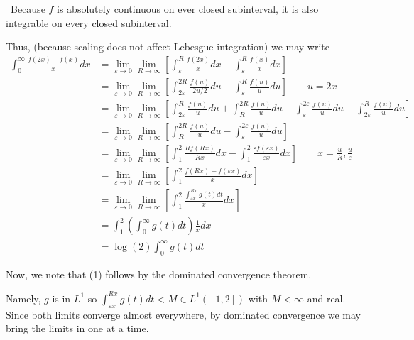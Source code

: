 \documentclass[12pt]{Homework}
\begin{document}
\begin{solution}$\,$
Because $f$ is absolutely continuous on ever closed subinterval, it is also integrable on every closed subinterval. 

Thus, (because scaling does not affect Lebesgue integration) we may write \begin{align*}
    \int_0^\infty\frac{f(2x)-f(x)}{x}dx&=\lim_{\varepsilon\to0}\lim_{R\to\infty}\left[\int_\varepsilon^R\frac{f(2x)}{x}dx-\int_\varepsilon^R\frac{f(x)}{x}dx\right]\\
    &=\lim_{\varepsilon\to0}\lim_{R\to\infty}\left[\int_{2\varepsilon}^{2R}\frac{f(u)}{2u/2}du-\int_\varepsilon^R\frac{f(u)}{u}du\right]\qquad u=2x\\
    &=\lim_{\varepsilon\to0}\lim_{R\to\infty}\left[\int_{2\varepsilon}^{R}\frac{f(u)}{u}du+\int_R^{2R}\frac{f(u)}{u}du-\int_\varepsilon^{2\varepsilon}\frac{f(u)}{u}du-\int_{2\varepsilon}^R\frac{f(u)}{u}du\right]\\
    &=\lim_{\varepsilon\to0}\lim_{R\to\infty}\left[\int_R^{2R}\frac{f(u)}{u}du-\int_\varepsilon^{2\varepsilon}\frac{f(u)}{u}du\right]\\
    &=\lim_{\varepsilon\to0}\lim_{R\to\infty}\left[\int_1^2\frac{Rf(Rx)}{Rx}dx-\int_1^2\frac{\varepsilon f(\varepsilon x)}{\varepsilon x}dx\right]\qquad x=\frac{u}{R},\frac{u}{\varepsilon} \\
    &=\lim_{\varepsilon\to0}\lim_{R\to\infty}\left[\int_1^2\frac{f(Rx)-f(\varepsilon x)}{x}dx\right]\\
    &=\lim_{\varepsilon\to0}\lim_{R\to\infty}\left[\int_1^2\frac{\int_{\varepsilon x}^{R x}g(t)dt}{x}dx\right]\\
    &=\int_1^2\left(\int_0^\infty g(t)dt\right)\frac{1}{x}dx\tag{1}\\
    &=\log(2)\int_0^\infty g(t)dt
\end{align*}

Now, we note that (1) follows by the dominated convergence theorem. 

Namely, $g$ is in $L^1$ so $\displaystyle \int_{\varepsilon x}^{R x}g(t)dt<M\in L^1([1,2])$ with $M<\infty$ and real. Since both limits converge almost everywhere, by dominated convergence we may bring the limits in one at a time. 
\end{solution}
\vspace{0.5cm}
\end{document}

